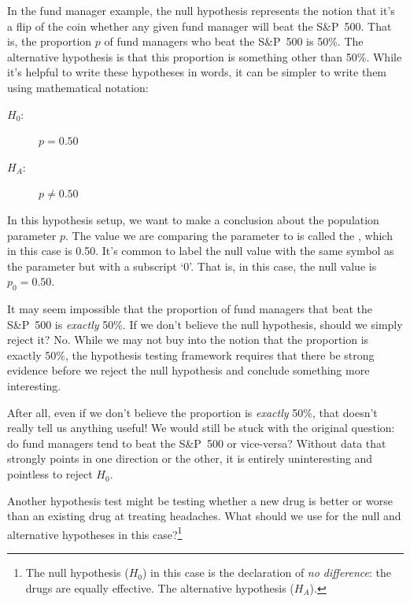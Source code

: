 In the fund manager example, the null hypothesis represents
the notion that it's a flip of the coin whether any given
fund manager will beat the S\&P~500. That is, the proportion
$p$ of fund managers who beat the S\&P~500 is 50\%.
The alternative hypothesis is that this proportion is something
other than 50\%. While it's helpful to write these hypotheses
in words, it can be simpler to write them using mathematical
notation:
\begin{description}
\item[$H_0$:] $p = 0.50$
\item[$H_A$:] $p \neq 0.50$
\end{description}
In this hypothesis setup, we want to make a conclusion about
the population parameter $p$. The value we are comparing the
parameter to is called the , which in this
case is 0.50. It's common to label the null value with the
same symbol as the parameter but with a subscript `0'.
That is, in this case, the null value is $p_0 = 0.50$.

\begin{example}{It may seem impossible that the
    proportion of fund managers that beat the S\&P~500
    is \emph{exactly} 50\%. If we don't believe the
    null hypothesis, should we simply reject it?}
  \label{fund_managers_sp500_not_reject_H0_interpretation}
  No. While we may not buy into the notion that
  the proportion is exactly 50\%, the hypothesis testing
  framework requires that there be strong evidence before
  we reject the null hypothesis and conclude something
  more interesting.

  After all, even if we don't believe the proportion is
  \emph{exactly} 50\%, that doesn't really tell us anything
  useful! We would still be stuck with the original question:
  do fund managers tend to beat the S\&P~500 or vice-versa?
  Without data that strongly
  points in one direction or the other, it is entirely
  uninteresting and pointless to reject $H_0$.
\end{example}

\begin{exercise}
  Another hypothesis test might be testing whether a new drug
  is better or worse than an existing drug at treating headaches.
  What should we use for the null and alternative hypotheses in
  this case?\footnote{The null hypothesis ($H_0$) in this case
  is the declaration of \emph{no difference}: the drugs are equally
  effective. The alternative hypothesis ($H_A$).}
\end{exercise}
  

